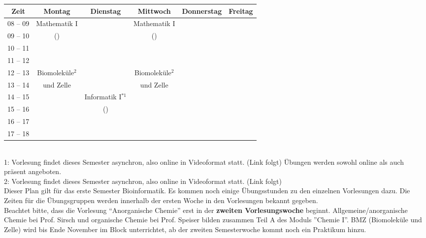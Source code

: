 \begin{minipage}{\textwidth}
    \footnotesize
\begin{tabular}{|c|c|c|c|c|c|} \hline
Zeit      & 			Montag 		& Dienstag			& Mittwoch 			& Donnerstag 			& Freitag	 \\\hline\hline
08 -- 09  & 		Mathematik I 	&  					& Mathematik I 		&  						&			\\\cline{1-1}\cline{3-3}\cline{5-6}
09 -- 10  & 		(\Matheprof)& 					    & (\Matheprof)      &  						&			\\\hline
10 -- 11  &							&					&					&						&			\\\hline
11 -- 12 & 							&  					&					&  			            & 			\\\hline
12 -- 13 & 			Biomoleküle$^2$	&  	                & Biomoleküle$^2$    & 			            &  \\\cline{1-1}\cline{3-3}\cline{5-6}
13 -- 14 & 				und Zelle   & 		            & und Zelle         & 						&  \\\hline
14 -- 15 & 				            & Informatik I$^{*1}$ & 				&  			& 				\\\cline{1-2}\cline{4-6}
15 -- 16 &			                & (\Infoprof) 	    & 					& 		& 				\\\cline{1-3} \cline{5-6}
16 -- 17 & & & & &\\\hline
17 -- 18 & & & & & \\\hline
\end{tabular}
\end{minipage}
\\
1: Vorlesung findet dieses Semester asynchron, also online in Videoformat statt. (Link folgt) Übungen werden sowohl online als auch präsent angeboten.\\
2: Vorlesung findet dieses Semester asynchron, also online in Videoformat statt. (Link folgt)
\\
Dieser Plan gilt für das erste Semester Bioinformatik. Es kommen noch einige Übungsstunden
zu den einzelnen Vorlesungen dazu. Die Zeiten für die Übungsgruppen werden innerhalb der ersten Woche in den Vorlesungen bekannt gegeben.\\
Beachtet bitte, dass die Vorlesung "`Anorganische Chemie"' erst in der \textbf{zweiten Vorlesungswoche} beginnt.
Allgemeine/anorganische Chemie bei Prof. Sirsch und organische Chemie bei Prof. Speiser bilden zusammen Teil A des Moduls ''Chemie I''.
BMZ (Biomoleküle und Zelle) wird bis Ende November im Block unterrichtet, ab der zweiten Semesterwoche kommt noch ein Praktikum hinzu.

